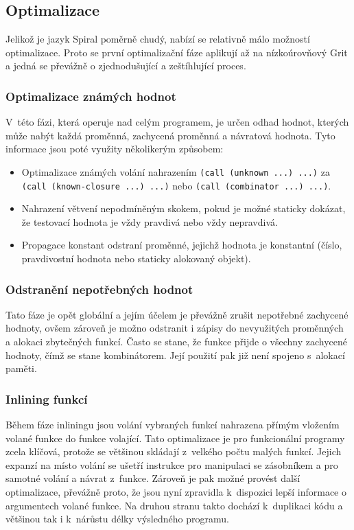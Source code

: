 \subsection{Optimalizace}

Jelikož je jazyk Spiral poměrně chudý, nabízí se relativně málo možností
optimalizace. Proto se první optimalizační fáze aplikují až na nízkoúrovňový
Grit a jedná se převážně o zjednodušující a zeštíhlující proces.

\subsubsection{Optimalizace známých hodnot}

V~této fázi, která operuje nad celým programem, je určen odhad hodnot, kterých
může nabýt každá proměnná, zachycená proměnná a návratová hodnota. Tyto
informace jsou poté využity několikerým způsobem:

\begin{itemize}
  \item Optimalizace známých volání nahrazením \texttt{(call (unknown ...) ...)}
    za \texttt{(call (known-closure ...) ...)} nebo \texttt{(call (combinator
    ...) ...)}.
  \item Nahrazení větvení nepodmíněným skokem, pokud je možné staticky dokázat,
    že testovací hodnota je vždy pravdivá nebo vždy nepravdivá.
  \item Propagace konstant odstraní proměnné, jejichž hodnota je konstantní
    (číslo, pravdivostní hodnota nebo staticky alokovaný objekt).
\end{itemize}

\subsubsection{Odstranění nepotřebných hodnot}

Tato fáze je opět globální a jejím účelem je převážně zrušit nepotřebné
zachycené hodnoty, ovšem zároveň je možno odstranit i zápisy do nevyužitých
proměnných a alokaci zbytečných funkcí. Často se stane, že funkce přijde o
všechny zachycené hodnoty, čímž se stane kombinátorem. Její použití pak již není
spojeno s~alokací paměti.

\subsubsection{Inlining funkcí}

Během fáze inliningu jsou volání vybraných funkcí nahrazena přímým vložením
volané funkce do funkce volající. Tato optimalizace je pro funkcionální programy
zcela klíčová, protože se většinou skládají z~velkého počtu malých funkcí.
Jejich expanzí na místo volání se ušetří instrukce pro manipulaci se zásobníkem
a pro samotné volání a návrat z~funkce. Zároveň je pak možné provést další
optimalizace, převážně proto, že jsou nyní zpravidla k~dispozici lepší informace
o argumentech volané funkce. Na druhou stranu takto dochází k~duplikaci kódu a
většinou tak i k~nárůstu délky výsledného programu.

